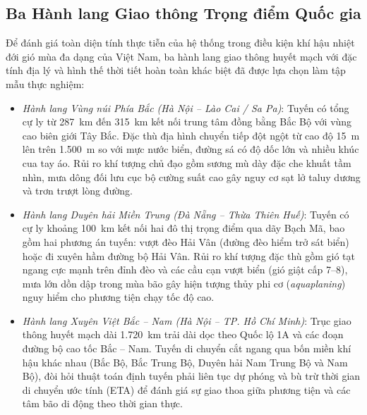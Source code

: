 \subsection{Ba Hành lang Giao thông Trọng điểm Quốc gia}
Để đánh giá toàn diện tính thực tiễn của hệ thống trong điều kiện khí hậu nhiệt đới gió mùa đa dạng của Việt Nam, ba hành lang giao thông huyết mạch với đặc tính địa lý và hình thế thời tiết hoàn toàn khác biệt đã được lựa chọn làm tập mẫu thực nghiệm:
\begin{itemize}
    \item[-] \textit{Hành lang Vùng núi Phía Bắc (Hà Nội -- Lào Cai / Sa Pa)}: Tuyến có tổng cự ly từ 287~km đến 315~km kết nối trung tâm đồng bằng Bắc Bộ với vùng cao biên giới Tây Bắc. Đặc thù địa hình chuyển tiếp đột ngột từ cao độ 15~m lên trên 1.500~m so với mực nước biển, đường sá có độ dốc lớn và nhiều khúc cua tay áo. Rủi ro khí tượng chủ đạo gồm sương mù dày đặc che khuất tầm nhìn, mưa dông đối lưu cục bộ cường suất cao gây nguy cơ sạt lở taluy dương và trơn trượt lòng đường.
    \item[-] \textit{Hành lang Duyên hải Miền Trung (Đà Nẵng -- Thừa Thiên Huế)}: Tuyến có cự ly khoảng 100~km kết nối hai đô thị trọng điểm qua dãy Bạch Mã, bao gồm hai phương án tuyến: vượt đèo Hải Vân (đường đèo hiểm trở sát biển) hoặc đi xuyên hầm đường bộ Hải Vân. Rủi ro khí tượng đặc thù gồm gió tạt ngang cực mạnh trên đỉnh đèo và các cầu cạn vượt biển (gió giật cấp 7--8), mưa lớn dồn dập trong mùa bão gây hiện tượng thủy phi cơ (\textit{aquaplaning}) nguy hiểm cho phương tiện chạy tốc độ cao.
    \item[-] \textit{Hành lang Xuyên Việt Bắc -- Nam (Hà Nội -- TP. Hồ Chí Minh)}: Trục giao thông huyết mạch dài 1.720~km trải dài dọc theo Quốc lộ 1A và các đoạn đường bộ cao tốc Bắc -- Nam. Tuyến di chuyển cắt ngang qua bốn miền khí hậu khác nhau (Bắc Bộ, Bắc Trung Bộ, Duyên hải Nam Trung Bộ và Nam Bộ), đòi hỏi thuật toán định tuyến phải liên tục dự phóng và bù trừ thời gian di chuyển ước tính (ETA) để đánh giá sự giao thoa giữa phương tiện và các tâm bão di động theo thời gian thực.
\end{itemize}

